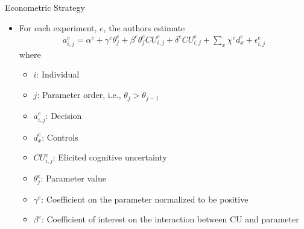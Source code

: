 \documentclass[11pt, aspectratio=169]{beamer}
\begin{document}
\begin{frame}{Econometric Strategy}
    
    \begin{itemize}
        \item For each experiment, $e$, the authors 
            estimate
            \begin{align}
                a_{i, j}^e=\alpha^e+\gamma^e \theta_j^e+\beta^e \theta_j^e C U_{i, j}^e+\delta^e C U_{i, j}^e+\sum_x \chi^e d_x^e+\epsilon_{i, j}^e
            \end{align}
            where
            \begin{center}
            \begin{minipage}{0.85\linewidth}
                \begin{multicols}{2}
                    \begin{itemize}
                        \setlength\itemsep{2pt}
                        \item $i$: Individual
                        \item $j$: Parameter order, i.e., $\theta_j>\theta_{j-1}$
                        \item $a_{i, j}^e$: Decision
                        \item $d_x^e$: Controls 
                        \item $C U_{i, j}^e$: Elicited cognitive uncertainty
                        \item $\theta_j^e$: Parameter value
                        \item $\gamma^e$: Coefficient on the parameter normalized to be positive
                        \item $\beta^e$: Coefficient of interest on the interaction between CU and parameter
                    \end{itemize}
                \end{multicols}
            \end{minipage}
            \end{center}
    \end{itemize}
    
\end{frame}

\end{document}
